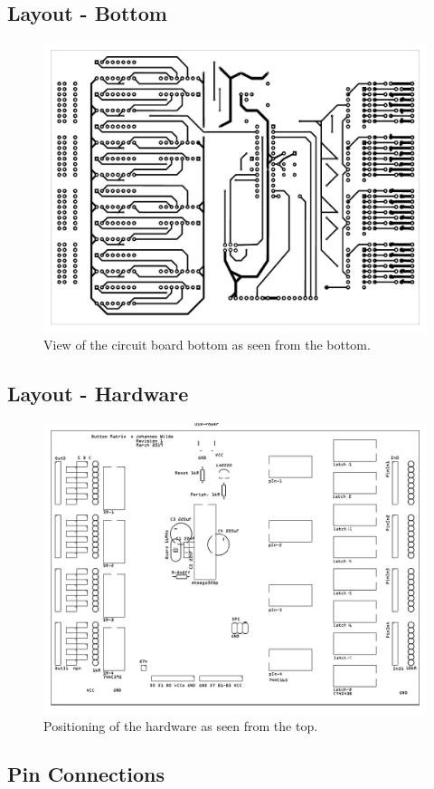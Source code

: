 \documentclass[english, parskip=half-, 11pt]{scrartcl}
\begin{document}
\subsection{Layout - Bottom}

\begin{figure}[H]
	\centering
	\includegraphics[width=.7\textwidth]{./Images/201902_GameBoard_fudged_final1_etch_copper_bottom_mirror.pdf}
	\caption{View of the circuit board bottom as seen from the bottom.}
	\label{fig:circuitBottom}
\end{figure}

\subsection{Layout - Hardware}

\begin{figure}[H]
	\centering
	\includegraphics[width=.7\textwidth]{./Images/201902_GameBoard_fudged_final1_grounded_named_etch_silk_top.pdf}
	\caption{Positioning of the hardware as seen from the top.}
	\label{fig:hardwareTop}
\end{figure}


\subsection{Pin Connections}
\end{document}
